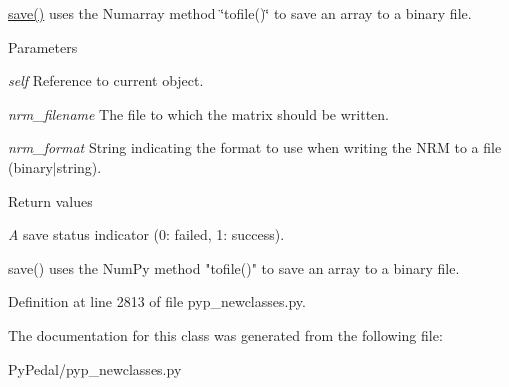 \hyperlink{classPyPedal_1_1pyp__newclasses_1_1NewAMatrix_ac2ee373f5e250c7ae637dc983f1b1651}{save()} uses the Numarray method \char`\"{}tofile()\char`\"{} to save an array to a binary file. 


\begin{DoxyParams}{Parameters}
\item[{\em self}]Reference to current object. \item[{\em nrm\_\-filename}]The file to which the matrix should be written. \item[{\em nrm\_\-format}]String indicating the format to use when writing the NRM to a file (binary$|$string). \end{DoxyParams}

\begin{DoxyRetVals}{Return values}
\item[{\em A}]save status indicator (0: failed, 1: success). \begin{DoxyVerb}
save() uses the NumPy method "tofile()" to save an array to a binary file.
\end{DoxyVerb}
 \end{DoxyRetVals}


Definition at line 2813 of file pyp\_\-newclasses.py.



The documentation for this class was generated from the following file:\begin{DoxyCompactItemize}
\item 
PyPedal/pyp\_\-newclasses.py\end{DoxyCompactItemize}
